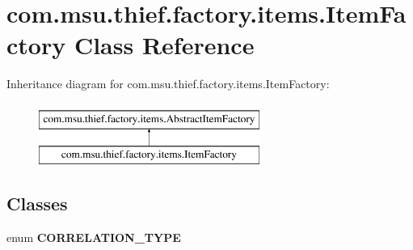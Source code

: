 \hypertarget{classcom_1_1msu_1_1thief_1_1factory_1_1items_1_1ItemFactory}{\section{com.\-msu.\-thief.\-factory.\-items.\-Item\-Factory Class Reference}
\label{classcom_1_1msu_1_1thief_1_1factory_1_1items_1_1ItemFactory}
}
Inheritance diagram for com.\-msu.\-thief.\-factory.\-items.\-Item\-Factory\-:\begin{figure}[H]
\begin{center}
\leavevmode
\includegraphics[height=2.000000cm]{classcom_1_1msu_1_1thief_1_1factory_1_1items_1_1ItemFactory}
\end{center}
\end{figure}
\subsection*{Classes}
\begin{DoxyCompactItemize}
\item 
enum {\bfseries C\-O\-R\-R\-E\-L\-A\-T\-I\-O\-N\-\_\-\-T\-Y\-P\-E}
\end{DoxyCompactItemize}
